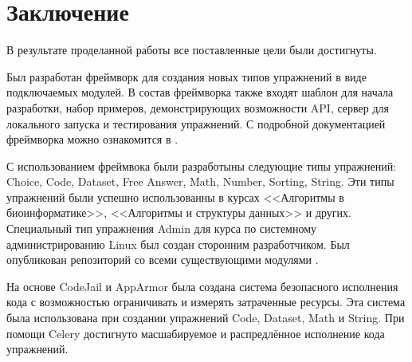 \documentclass{matmex-diploma-custom}
\begin{document}
\section*{Заключение}
В результате проделанной работы все поставленные цели были
достигнуты.

Был разработан фреймворк для создания новых типов упражнений в виде
подключаемых модулей. В состав фреймворка также входят шаблон для
начала разработки, набор примеров, демонстрирующих возможности API,
сервер для локального запуска и тестирования упражнений. С подробной
документацией фреймворка можно ознакомится в \cite{plugins:doc}.

С использованием фреймвока были разработыны следующие типы упражнений:
Choice, Code, Dataset, Free Answer, Math, Number, Sorting, String. Эти
типы упражнений были успешно использованны в курсах <<Алгоритмы в
биоинформатике>>, <<Алгоритмы и структуры данных>> и
других. Специальный тип упражнения Admin для курса по системному
администрированию Linux был создан сторонним разработчиком. Был
опубликован репозиторий со всеми существующими модулями
\cite{plugins:repo}.

На основе CodeJail и AppArmor была создана система безопасного
исполнения кода с возможностью ограничивать и измерять затраченные
ресурсы. Эта система была использована при создании упражнений Code,
Dataset, Math и String. При помощи Celery достигнуто масшабируемое и
распредлённое исполнение кода упражнений.

\clearpage
{}


\end{document}
